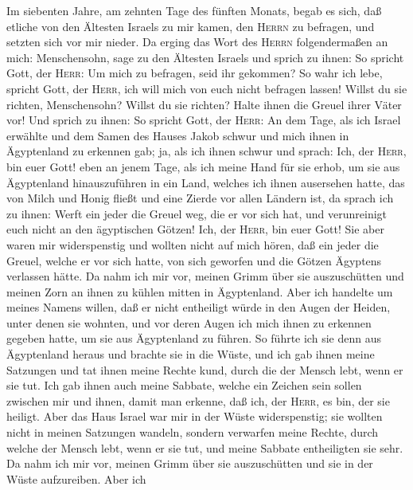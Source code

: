  Im siebenten Jahre, am zehnten Tage des fünften Monats,
begab es sich, daß etliche von den Ältesten Israels zu mir kamen, den
\textsc{Herrn} zu befragen, und setzten sich vor mir nieder.
 Da erging das Wort des \textsc{Herrn} folgendermaßen an
mich:  Menschensohn, sage zu den Ältesten Israels und
sprich zu ihnen: So spricht Gott, der \textsc{Herr}: Um mich zu
befragen, seid ihr gekommen? So wahr ich lebe, spricht Gott, der
\textsc{Herr}, ich will mich von euch nicht befragen lassen!
 Willst du sie richten, Menschensohn? Willst du sie
richten? Halte ihnen die Greuel ihrer Väter vor!  Und
sprich zu ihnen: So spricht Gott, der \textsc{Herr}: An dem Tage, als
ich Israel erwählte und dem Samen des Hauses Jakob schwur und mich ihnen
in Ägyptenland zu erkennen gab; ja, als ich ihnen schwur und sprach:
Ich, der \textsc{Herr}, bin euer Gott!  eben an jenem
Tage, als ich meine Hand für sie erhob, um sie aus Ägyptenland
hinauszuführen in ein Land, welches ich ihnen ausersehen hatte, das von
Milch und Honig fließt und eine Zierde vor allen Ländern ist,
 da sprach ich zu ihnen: Werft ein jeder die Greuel weg,
die er vor sich hat, und verunreinigt euch nicht an den ägyptischen
Götzen! Ich, der \textsc{Herr}, bin euer Gott!  Sie aber
waren mir widerspenstig und wollten nicht auf mich hören, daß ein jeder
die Greuel, welche er vor sich hatte, von sich geworfen und die Götzen
Ägyptens verlassen hätte. Da nahm ich mir vor, meinen Grimm über sie
auszuschütten und meinen Zorn an ihnen zu kühlen mitten in Ägyptenland.
 Aber ich handelte um meines Namens willen, daß er nicht
entheiligt würde in den Augen der Heiden, unter denen sie wohnten, und
vor deren Augen ich mich ihnen zu erkennen gegeben hatte, um sie aus
Ägyptenland zu führen.  So führte ich sie denn aus
Ägyptenland heraus und brachte sie in die Wüste,  und ich
gab ihnen meine Satzungen und tat ihnen meine Rechte kund, durch die der
Mensch lebt, wenn er sie tut.  Ich gab ihnen auch meine
Sabbate, welche ein Zeichen sein sollen zwischen mir und ihnen, damit
man erkenne, daß ich, der \textsc{Herr}, es bin, der sie heiligt.
 Aber das Haus Israel war mir in der Wüste widerspenstig;
sie wollten nicht in meinen Satzungen wandeln, sondern verwarfen meine
Rechte, durch welche der Mensch lebt, wenn er sie tut, und meine Sabbate
entheiligten sie sehr. Da nahm ich mir vor, meinen Grimm über sie
auszuschütten und sie in der Wüste aufzureiben.  Aber ich
